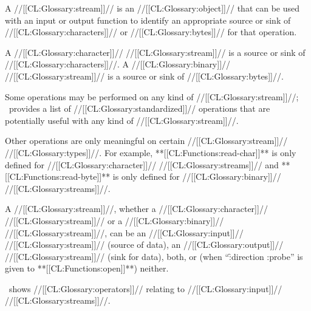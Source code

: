 


A //[[CL:Glossary:stream]]// is an //[[CL:Glossary:object]]// that can be used with an input or output function to identify an appropriate source or sink of //[[CL:Glossary:characters]]// or  //[[CL:Glossary:bytes]]// for that operation.

A //[[CL:Glossary:character]]// //[[CL:Glossary:stream]]// is a source or sink of //[[CL:Glossary:characters]]//. A //[[CL:Glossary:binary]]// //[[CL:Glossary:stream]]// is a source or sink of //[[CL:Glossary:bytes]]//.

Some operations may be performed on any kind of //[[CL:Glossary:stream]]//; \thenextfigure\ provides a list of //[[CL:Glossary:standardized]]// operations that are potentially useful with any kind of //[[CL:Glossary:stream]]//.


Other operations are only meaningful on certain //[[CL:Glossary:stream]]// //[[CL:Glossary:types]]//. For example, **[[CL:Functions:read-char]]** is only defined for //[[CL:Glossary:character]]// //[[CL:Glossary:streams]]// and **[[CL:Functions:read-byte]]** is only defined for //[[CL:Glossary:binary]]// //[[CL:Glossary:streams]]//.



A //[[CL:Glossary:stream]]//, whether a //[[CL:Glossary:character]]// //[[CL:Glossary:stream]]// or a //[[CL:Glossary:binary]]// //[[CL:Glossary:stream]]//, can be an //[[CL:Glossary:input]]// //[[CL:Glossary:stream]]// (source of data),
       an //[[CL:Glossary:output]]// //[[CL:Glossary:stream]]// (sink for data),
       both, 
    or (\eg when ``\f{:direction :probe}'' is given to **[[CL:Functions:open]]**) neither.

\Thenextfigure\ shows //[[CL:Glossary:operators]]// relating to //[[CL:Glossary:input]]// //[[CL:Glossary:streams]]//.

 

